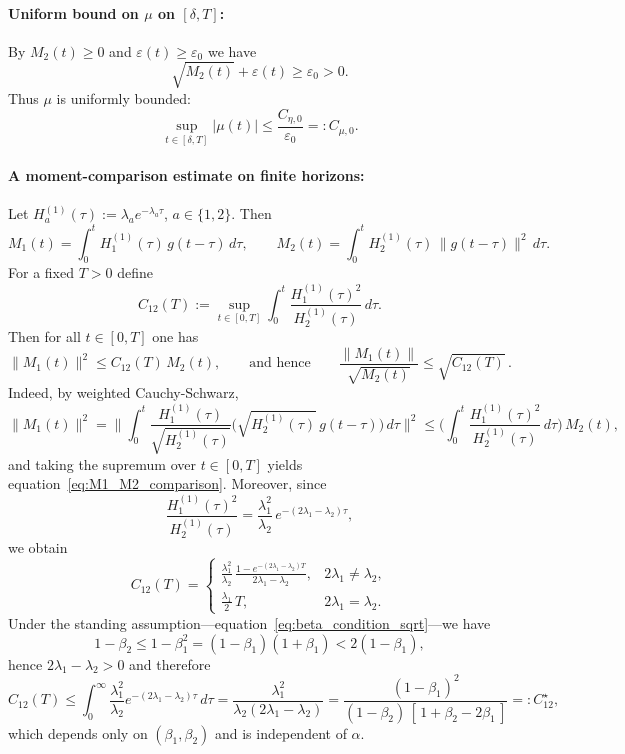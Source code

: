 \documentclass{article} %
\def\eqref#1{equation~\ref{#1}}
\begin{document}
\paragraph{Uniform bound on $\mu$ on $[\delta,T]$:}
By $M_2(t)\ge 0$ and $\varepsilon(t)\ge \varepsilon_0$ we have
\[
\sqrt{M_2(t)}+\varepsilon(t)\ge \varepsilon_0>0.
\]
Thus $\mu$ is uniformly bounded:
\[
\sup_{t\in[\delta,T]}|\mu(t)|\le \frac{C_{\eta,0}}{\varepsilon_0}=:C_{\mu,0}.
\]

\paragraph{A moment-comparison estimate on finite horizons:}
Let $H^{(1)}_a(\tau):=\lambda_a e^{-\lambda_a\tau}$, $a\in\{1,2\}$. Then
\[
M_1(t)=\int_0^t H^{(1)}_1(\tau)\,g(t-\tau)\,d\tau,\qquad
M_2(t)=\int_0^t H^{(1)}_2(\tau)\,\|g(t-\tau)\|^2\,d\tau.
\]
For a fixed $T>0$ define
\[
C_{12}(T):=\sup_{t\in[0,T]}\int_0^t \frac{H^{(1)}_1(\tau)^2}{H^{(1)}_2(\tau)}\,d\tau.
\]
Then for all $t\in[0,T]$ one has
\begin{equation}\label{eq:M1_M2_comparison}
\|M_1(t)\|^2 \le C_{12}(T)\, M_2(t),
\qquad\text{and hence}\qquad
\frac{\|M_1(t)\|}{\sqrt{M_2(t)}}\le \sqrt{C_{12}(T)}\,.
\end{equation}
Indeed, by weighted Cauchy-Schwarz,
\[
\|M_1(t)\|^2
=\Big\|\int_0^t \frac{H^{(1)}_1(\tau)}{\sqrt{H^{(1)}_2(\tau)}}\Big(\sqrt{H^{(1)}_2(\tau)}\,g(t-\tau)\Big)\,d\tau\Big\|^2
\le \Big(\int_0^t \frac{H^{(1)}_1(\tau)^2}{H^{(1)}_2(\tau)}\,d\tau\Big)\,M_2(t),
\]
and taking the supremum over $t\in[0,T]$ yields \eqref{eq:M1_M2_comparison}. Moreover, since
\[
\frac{H^{(1)}_1(\tau)^2}{H^{(1)}_2(\tau)}
=\frac{\lambda_1^2}{\lambda_2}\,e^{-(2\lambda_1-\lambda_2)\tau},
\]
we obtain
\[
C_{12}(T)=
\begin{cases}
\frac{\lambda_1^2}{\lambda_2}\,\frac{1-e^{-(2\lambda_1-\lambda_2)T}}{2\lambda_1-\lambda_2}, & 2\lambda_1\neq\lambda_2,\\[6pt]
\frac{\lambda_1}{2}\,T, & 2\lambda_1=\lambda_2.
\end{cases}
\]
Under the standing assumption---\eqref{eq:beta_condition_sqrt}---we have
\[
1-\beta_2 \le 1-\beta_1^2 = (1-\beta_1)(1+\beta_1) < 2(1-\beta_1),
\]
hence $2\lambda_1-\lambda_2>0$ and therefore
\[
C_{12}(T)\le \int_0^\infty \frac{\lambda_1^2}{\lambda_2}e^{-(2\lambda_1-\lambda_2)\tau}\,d\tau
=\frac{\lambda_1^2}{\lambda_2(2\lambda_1-\lambda_2)}
=\frac{(1-\beta_1)^2}{(1-\beta_2)\,[\,1+\beta_2-2\beta_1\,]}
=:C_{12}^\star,
\]
which depends only on $(\beta_1,\beta_2)$ and is independent of $\alpha$.
\end{document}
